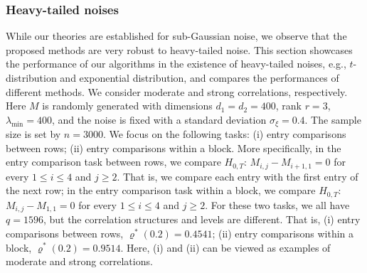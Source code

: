\documentclass[12pt]{article}
\theoremstyle{plain}
\begin{document}
\begin{sloppypar}
\subsubsection{Heavy-tailed noises}
While our theories are established for sub-Gaussian noise, we observe that the proposed methods are very robust to heavy-tailed noise. This section showcases the performance of our algorithms in the existence of heavy-tailed noises, e.g., $t$-distribution and exponential distribution, and compares the performances of different methods. We consider moderate and strong correlations, respectively. Here $M$ is randomly generated with dimensions $d_1=d_2=400$, rank $r=3$, $\lambda_{\min}=400$, and the noise is fixed with a standard deviation $\sigma_\xi=0.4$. The sample size is set by $n=3000$. We focus on the following tasks: (i) entry comparisons between rows; (ii) entry comparisons within a block. More specifically, in the entry comparison task between rows, we compare $H_{0,T}$: $M_{i,j}-M_{i+1,1}=0$ for every $1\le i\le 4$ and $j\ge 2$. That is, we compare each entry with the first entry of the next row; in the entry comparison task within a block, we compare $H_{0,T}$: $M_{i,j}-M_{1,1}=0$ for every  $1\le i\le 4$ and $j\ge 2$. For these two tasks, we all have $q=1596$, but the correlation structures and levels are different. That is, (i) entry comparisons between rows, $\varrho^*(0.2)=0.4541$; (ii) entry comparisons within a block, $\varrho^*(0.2)=0.9514$. Here, (i) and (ii) can be viewed as examples of moderate and strong correlations.


\end{sloppypar}
\end{document}
